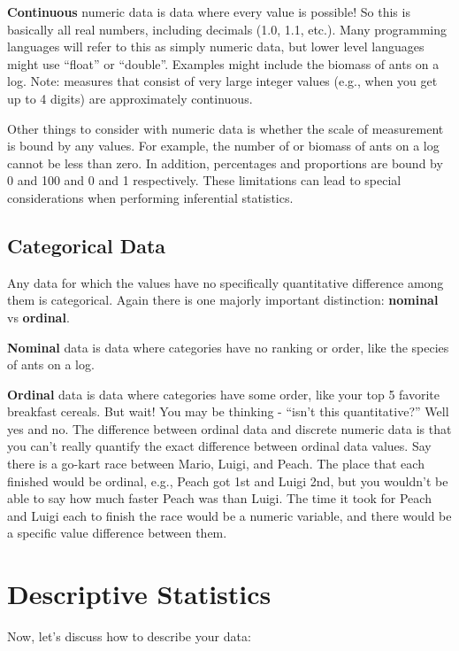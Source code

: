 \documentclass[
  letterpaper,
  DIV=11,
  numbers=noendperiod]{scrreprt}
\begin{document}
\textbf{Continuous} numeric data is data where every value is possible!
So this is basically all real numbers, including decimals (1.0, 1.1,
etc.). Many programming languages will refer to this as simply numeric
data, but lower level languages might use ``float'' or ``double''.
Examples might include the biomass of ants on a log. Note: measures that
consist of very large integer values (e.g., when you get up to 4 digits)
are approximately continuous.

Other things to consider with numeric data is whether the scale of
measurement is bound by any values. For example, the number of or
biomass of ants on a log cannot be less than zero. In addition,
percentages and proportions are bound by 0 and 100 and 0 and 1
respectively. These limitations can lead to special considerations when
performing inferential statistics.

\section{Categorical Data}\label{categorical-data}

Any data for which the values have no specifically quantitative
difference among them is categorical. Again there is one majorly
important distinction: \textbf{nominal} vs \textbf{ordinal}.

\textbf{Nominal} data is data where categories have no ranking or order,
like the species of ants on a log.

\textbf{Ordinal} data is data where categories have some order, like
your top 5 favorite breakfast cereals. But wait! You may be thinking -
``isn't this quantitative?'' Well yes and no. The difference between
ordinal data and discrete numeric data is that you can't really quantify
the exact difference between ordinal data values. Say there is a go-kart
race between Mario, Luigi, and Peach. The place that each finished would
be ordinal, e.g., Peach got 1st and Luigi 2nd, but you wouldn't be able
to say how much faster Peach was than Luigi. The time it took for Peach
and Luigi each to finish the race would be a numeric variable, and there
would be a specific value difference between them.

\chapter{Descriptive Statistics}\label{descriptive-statistics}

Now, let's discuss how to describe your data:
\end{document}
